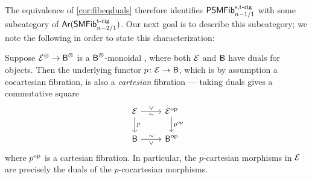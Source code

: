 \documentclass[a4paper,11pt]{article}
\begin{document}
The equivalence of
\cref{cor:fibeqduals} therefore identifies $\textup{\textsf{PSMFib}}^{\text{\textup{s,t-rig}}}_{n-1/1}$ with some subcategory of
$\textup{\textsf{Ar}}(\textup{\textsf{SMFib}}^{\text{\textup{t-rig}}}_{n-2/1})$. Our next goal is to describe this
subcategory; we note the following in order to state this
characterization:

\begin{observation}\label{obs:duals implies cartesian}
  Suppose $\eE^{\otimes} \to \oB^{\otimes}$ is a
  $\textup{\textsf{B}}^{\otimes}$-monoidal \incat{}, where both $\mathcal{E}$ and $\textup{\textsf{B}}$ have
  duals for objects. Then the underlying functor $p \colon \eE \to
  \oB$, which is by assumption a cocartesian fibration, is also a
  \emph{cartesian} fibration --- taking duals gives a commutative
  square
  \[
    \begin{tikzcd}
      \eE \ar[r, "\vee"{above}, "\sim"{below}] \ar[d, "p"] & \eE^{\op}
      \ar[d, "p^{\op}"] \\
      \oB \ar[r, "\vee"{below}, "\sim"{above}] & \oB^{\op}
    \end{tikzcd}
  \]
  where $p^{\text{\textup{op}}}$ is a cartesian fibration. In particular, the
  $p$-cartesian morphisms in $\mathcal{E}$ are precisely the duals of the
  $p$-cocartesian morphisms.
\end{observation}
\end{document}
